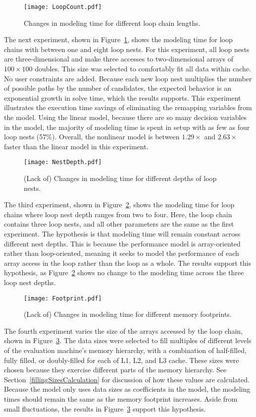 \begin{figure}
	\centering
	\texttt{[image: LoopCount.pdf]}
\caption{Changes in modeling time for different loop chain lengths.}\label{LoopCount}
\end{figure}
The next experiment, shown in Figure~\ref{LoopCount}, shows the modeling time for loop chains with between one and eight loop nests.
For this experiment, all loop nests are three-dimensional and make three accesses to two-dimensional arrays of $100\times100$ doubles. 
This size was selected to comfortably fit all data within cache.
No user constraints are added.
Because each new loop nest multiplies the number of possible paths by the number of candidates, the expected behavior is an exponential growth in solve time, which the results supports.
This experiment illustrates the execution time savings of eliminating the remapping variables from the model.
Using the linear model, because there are so many decision variables in the model, the majority of modeling time is spent in setup with as few as four loop nests (57\%).
Overall, the nonlinear model is between $1.29\times$ and $2.63\times$ faster than the linear model in this experiment.

\begin{figure}
	\centering
	\texttt{[image: NestDepth.pdf]}
	\caption{(Lack of) Changes in modeling time for different depths of loop nests.}\label{NestDepth}
\end{figure}
The third experiment, shown in Figure~\ref{NestDepth}, shows the modeling time for loop chains where loop nest depth ranges from two to four.
Here, the loop chain contains three loop nests, and all other parameters are the same as the first experiment.
The hypothesis is that modeling time will remain constant across different nest depths.
This is because the performance model is array-oriented rather than loop-oriented, meaning it seeks to model the performance of each array access in the loop rather than the loop as a whole.
The results support this hypothesis, as Figure~\ref{NestDepth} shows no change to the modeling time across the three loop nest depths.

\begin{figure}
	\centering
	\texttt{[image: Footprint.pdf]}
\caption{(Lack of) Changes in modeling time for different memory footprints.}\label{Footprint}
\end{figure}
The fourth experiment varies the size of the arrays accessed by the loop chain, shown in Figure~\ref{Footprint}.
The data sizes were selected to fill multiples of different levels of the evaluation machine's memory hierarchy, with a combination of half-filled, fully filled, or doubly-filled for each of L1, L2, and L3 cache.
These sizes were chosen because they exercise different parts of the memory hierarchy.
See Section~\ref{fillingSizesCalculation} for discussion of how these values are calculated.
Because the model only uses data sizes as coefficients in the model, the modeling times should remain the same as the memory footprint increases.
Aside from small fluctuations, the results in Figure~\ref{Footprint} support this hypothesis.

